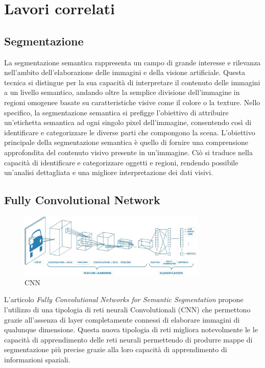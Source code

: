 
\chapter{Lavori correlati} \label{chap:related_works}
\section{Segmentazione} \label{sec:segmentazione} 

La segmentazione semantica rappresenta un campo di grande interesse e rilevanza
nell'ambito dell'elaborazione delle immagini e della visione artificiale. Questa
tecnica si distingue per la sua capacità di interpretare il contenuto delle
immagini a un livello semantico, andando oltre la semplice divisione
dell'immagine in regioni omogenee basate su caratteristiche visive come il
colore o la texture. Nello specifico, la segmentazione semantica si prefigge
l'obiettivo di attribuire un'etichetta semantica ad ogni singolo pixel
dell'immagine, consentendo così di identificare e categorizzare le diverse parti
che compongono la scena.  L'obiettivo principale della segmentazione semantica è
quello di fornire una comprensione approfondita del contenuto visivo presente in
un'immagine. Ciò si traduce nella capacità di identificare e categorizzare
oggetti e regioni, rendendo possibile un'analisi dettagliata e una migliore
interpretazione dei dati visivi.



\section{Fully Convolutional Network} 
\begin{figure}[H]
  \begin{center}
    \includegraphics[width=0.8\textwidth]{Immagini/cnn.png}
  \end{center}
  \caption{CNN}
  \label{fig:cnn}
\end{figure}



\label{sec:fcn} L'articolo \textit{Fully
Convolutional Networks for Semantic Segmentation} \cite{long2015fully} propone
l'utilizzo di una tipologia di reti neurali Convolutionali (CNN) che permettono
grazie all'assenza di layer completamente connessi di elaborare immagini di
qualunque dimensione. Questa nuova tipologia di reti migliora notevolmente le
le capacità di apprendimento delle reti neurali permettendo di produrre mappe
di segmentazione più precise grazie alla loro capacità di apprendimento di
informazioni spaziali.


